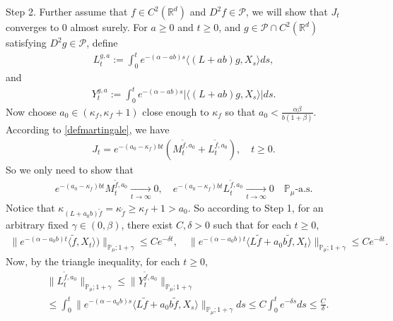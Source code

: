 \documentclass[12pt,a4paper]{amsart}
\theoremstyle{plain}
\theoremstyle{definition}
\numberwithin{equation}{section}
\begin{document}
	Step 2.
	Further assume that $f\in C^2(\mathbb R^d)$ and $D^2f \in \mathcal{P}$, we will show that $J_t$ converges to $0$ almost surely.
	For $a \geq 0$ and $ t\geq 0$, and $g\in \mathcal{P}\cap C^2(\mathbb{R}^d)$ satisfying $D^2g\in \mathcal{P}$, define
\begin{equation}\begin{split}
	L_t^{g,a}:=\int_0^t e^{-(\alpha-ab)s}\langle (L+ab)g,X_s\rangle ds,
\end{split}\end{equation}
and
\begin{equation}\begin{split}
    Y_t^{g,a}
    :=\int_0^t e^{-(\alpha-ab)s}|\langle (L+ab)g,X_s\rangle|ds.
\end{split}\end{equation}
	Now choose $a_0 \in (\kappa_{f}, \kappa_f + 1)$ close enough to $\kappa_f$ so that $a_0 < \frac{\alpha \beta}{b(1+\beta)}$.
	According to \eqref{defmartingale}, we have
\begin{align*}
    J_t
    =e^{-(a_0-\kappa_f)bt} (M_t^{\tilde{f}, a_0}+L_t^{\tilde{f}, a_0}),
    \quad t\geq 0.
\end{align*}
	So we only need to show that
\begin{align*}
    e^{-(a_0-\kappa_f)b t}M_t^{\tilde{f},a_0}
    \xrightarrow[t\to \infty]{} 0,
    \quad e^{-(a_0-\kappa_f)b t}L_t^{\tilde{f},a_0}
    \xrightarrow[t\to \infty]{} 0
    \quad \mathbb{P}_{\mu}\text{-a.s.}
\end{align*}
	Notice that $\kappa_{(L+a_0 b)\tilde{f}}=\kappa_{\tilde{f}}\geq \kappa_f+1 > a_0$.
	So according to Step 1, for an arbitrary fixed $\gamma\in (0,\beta)$, there exist $C, \delta>0$ such that for each $t\geq 0$,
\begin{equation}\begin{split}
    \|e^{-(\alpha-a_0 b)t}\langle \tilde{f},X_t\rangle)\|_{\mathbb{P}_{\mu};1+\gamma}
    \leq C e^{-\delta t},
    \quad \|e^{-(\alpha-a_0 b)t}\langle L\tilde{f}+a_0 b\tilde{f},X_t\rangle\|_{\mathbb{P}_{\mu};1+\gamma}
    \leq C e^{-\delta t}.
\end{split}\end{equation}
	Now, by the triangle inequality, for each $t\geq 0$,
\begin{align*}
    &\|L_t^{\tilde{f},a_0}\|_{\mathbb{P}_{\mu};1+\gamma}
    \leq\|Y_t^{\tilde{f},a_0}\|_{\mathbb{P}_{\mu};1+\gamma}
    \\&\leq \int_0^t \|e^{-(\alpha-a_0 b)s}\langle L\tilde{f}+a_0 b\tilde{f},X_s\rangle\|_{\mathbb{P}_{\mu};1+\gamma}ds\leq C \int_0^t e^{-\delta s}ds\leq\frac{C}{\delta}.
\end{align*}
\end{document}
